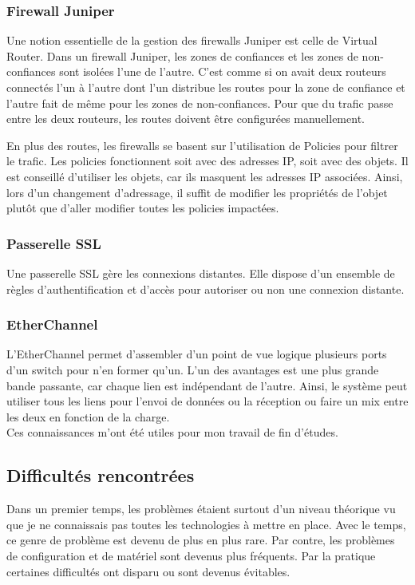 \subsubsection{Firewall Juniper}
Une notion essentielle de la gestion des firewalls Juniper est celle de Virtual Router.
Dans un firewall Juniper, les zones de confiances et les zones de non-confiances sont isolées l'une de l'autre.
C'est comme si on avait deux routeurs connectés l'un à l'autre dont l'un distribue les routes pour la zone de confiance et l'autre fait de même pour les zones de non-confiances.
Pour que du trafic passe entre les deux routeurs, les routes doivent être configurées manuellement.

En plus des routes, les firewalls se basent sur l'utilisation de Policies pour filtrer le trafic.
Les policies fonctionnent soit avec des adresses IP, soit avec des objets. 
Il est conseillé d'utiliser les objets, car ils masquent les adresses IP associées. 
Ainsi, lors d'un changement d'adressage, il suffit de modifier les propriétés de l'objet plutôt que d'aller modifier toutes les policies impactées.
\subsubsection{Passerelle SSL}
Une passerelle SSL gère les connexions distantes.
Elle dispose d'un ensemble de règles d'authentification et d'accès pour autoriser ou non une connexion distante.

\subsubsection{EtherChannel}
L'EtherChannel permet d'assembler d'un point de vue logique plusieurs ports d'un switch pour n'en former qu'un.
L'un des avantages est une plus grande bande passante, car chaque lien est indépendant de l'autre.
Ainsi, le système peut utiliser tous les liens pour l'envoi de données ou la réception ou faire un mix entre les deux en fonction de la charge. \\

Ces connaissances m'ont été utiles pour mon travail de fin d'études. 

\subsection{Difficultés rencontrées}
Dans un premier temps, les problèmes étaient surtout d'un niveau théorique vu que je ne connaissais pas toutes les technologies à mettre en place. Avec le temps, ce genre de problème est devenu de plus en plus rare.
Par contre, les problèmes de configuration et de matériel sont devenus plus fréquents.
Par la pratique certaines difficultés ont disparu ou sont devenus évitables. 

